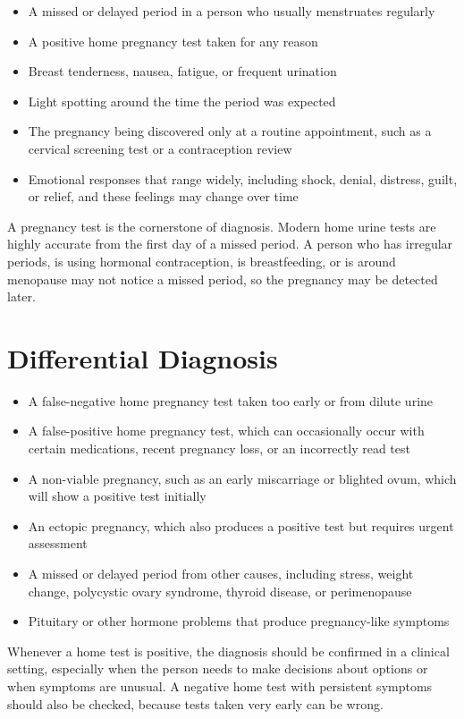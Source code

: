 \begin{itemize}
    \item A missed or delayed period in a person who usually menstruates regularly
    \item A positive home pregnancy test taken for any reason
    \item Breast tenderness, nausea, fatigue, or frequent urination
    \item Light spotting around the time the period was expected
    \item The pregnancy being discovered only at a routine appointment, such as a cervical screening test or a contraception review
    \item Emotional responses that range widely, including shock, denial, distress, guilt, or relief, and these feelings may change over time
\end{itemize}

A pregnancy test is the cornerstone of diagnosis. Modern home urine tests are highly accurate from the first day of a missed period. A person who has irregular periods, is using hormonal contraception, is breastfeeding, or is around menopause may not notice a missed period, so the pregnancy may be detected later.

\section*{Differential Diagnosis}
\begin{itemize}
    \item A false-negative home pregnancy test taken too early or from dilute urine
    \item A false-positive home pregnancy test, which can occasionally occur with certain medications, recent pregnancy loss, or an incorrectly read test
    \item A non-viable pregnancy, such as an early miscarriage or blighted ovum, which will show a positive test initially
    \item An ectopic pregnancy, which also produces a positive test but requires urgent assessment
    \item A missed or delayed period from other causes, including stress, weight change, polycystic ovary syndrome, thyroid disease, or perimenopause
    \item Pituitary or other hormone problems that produce pregnancy-like symptoms
\end{itemize}

Whenever a home test is positive, the diagnosis should be confirmed in a clinical setting, especially when the person needs to make decisions about options or when symptoms are unusual. A negative home test with persistent symptoms should also be checked, because tests taken very early can be wrong.


